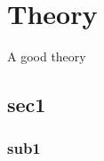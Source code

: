 
\chapter{Theory} %

\label{Theory} %


\newcommand{\keyword}[1]{\textbf{#1}}
\newcommand{\tabhead}[1]{\textbf{#1}}
\newcommand{\code}[1]{\texttt{#1}}
\newcommand{\file}[1]{\texttt{\bfseries#1}}
\newcommand{\option}[1]{\texttt{\itshape#1}}

A good theory
\section{sec1}
\subsection{sub1}

